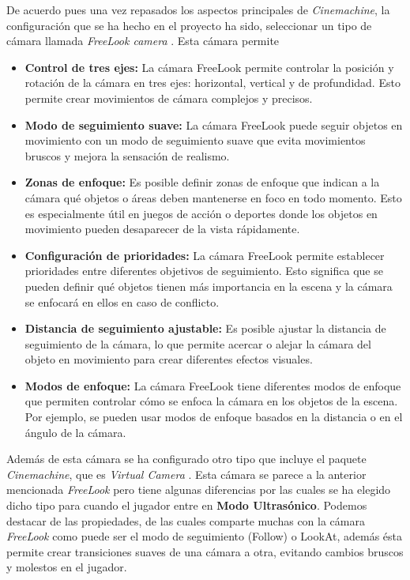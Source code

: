 De acuerdo pues una vez repasados los aspectos principales de \textit{Cinemachine}, la configuración que se ha hecho en el proyecto ha sido, 
seleccionar un tipo de cámara llamada \textit{FreeLook camera} \cite{CinemachineFreelook}. Esta cámara permite 
\begin{itemize}    
    \item \textbf{Control de tres ejes:} La cámara FreeLook permite controlar la posición y rotación de la cámara en tres ejes: horizontal, vertical y de profundidad. Esto permite crear movimientos de cámara complejos y precisos.
   
    \item \textbf{Modo de seguimiento suave:} La cámara FreeLook puede seguir objetos en movimiento con un modo de seguimiento suave que evita movimientos bruscos y mejora la sensación de realismo.

    \item \textbf{Zonas de enfoque:} Es posible definir zonas de enfoque que indican a la cámara qué objetos o áreas deben mantenerse en foco en todo momento. Esto es especialmente útil en juegos de acción o deportes donde los objetos en movimiento pueden desaparecer de la vista rápidamente.

    \item \textbf{Configuración de prioridades:} La cámara FreeLook permite establecer prioridades entre diferentes objetivos de seguimiento. Esto significa que se pueden definir qué objetos tienen más importancia en la escena y la cámara se enfocará en ellos en caso de conflicto.

    \item \textbf{Distancia de seguimiento ajustable:} Es posible ajustar la distancia de seguimiento de la cámara, lo que permite acercar o alejar la cámara del objeto en movimiento para crear diferentes efectos visuales.

    \item \textbf{Modos de enfoque:} La cámara FreeLook tiene diferentes modos de enfoque que permiten controlar cómo se enfoca la cámara en los objetos de la escena. Por ejemplo, se pueden usar modos de enfoque basados en la distancia o en el ángulo de la cámara.
\end{itemize}

Además de esta cámara se ha configurado otro tipo que incluye el paquete \textit{Cinemachine}, que es \textit{Virtual Camera} \cite{CinemachineVirtualCamera}. Esta cámara se parece a la anterior mencionada \textit{FreeLook} pero tiene algunas diferencias por las cuales se ha elegido dicho tipo para cuando el jugador entre en \textbf{Modo Ultrasónico}. Podemos destacar de las propiedades, de las cuales comparte muchas con la cámara \textit{FreeLook} como puede ser el modo de seguimiento (Follow) o LookAt, además ésta permite crear transiciones suaves de una cámara a otra, evitando cambios bruscos y molestos en el jugador. 


